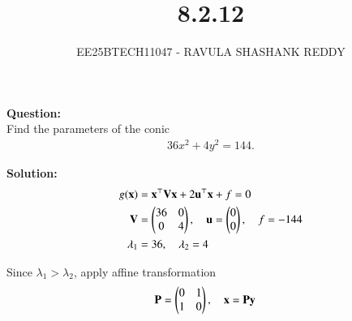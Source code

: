 \documentclass[journal]{article}
\begin{document}
	
	
	\vspace{3cm}
	
\title{8.2.12}
\author{EE25BTECH11047 - RAVULA SHASHANK REDDY}
\maketitle
\hrulefill
\bigskip 

\renewcommand{\thetable}{\theenumi}
\setlength{\intextsep}{10pt}

\textbf{Question:} \\

Find the parameters of the conic
\begin{align*}
   36x^2+4y^2=144. 
\end{align*}

\textbf{Solution:}
\begin{align}
g(\mathbf{x}) &= \mathbf{x}^\top \mathbf{V} \mathbf{x} + 2\mathbf{u}^\top \mathbf{x} + f = 0 \\
\mathbf{V} &= \begin{pmatrix}36 & 0 \\ 0 & 4\end{pmatrix}, \quad 
\mathbf{u}=\begin{pmatrix}0\\0\end{pmatrix}, \quad 
f=-144\\
\lambda_1 &= 36, \quad \lambda_2 = 4 \\
\end{align}

Since $\lambda_1 > \lambda_2$, apply affine transformation
\begin{align}
\mathbf{P} &= \begin{pmatrix}0 & 1 \\ 1 & 0\end{pmatrix}, \quad \mathbf{x} = \mathbf{P}\mathbf{y}
\end{align}
\end{document}
